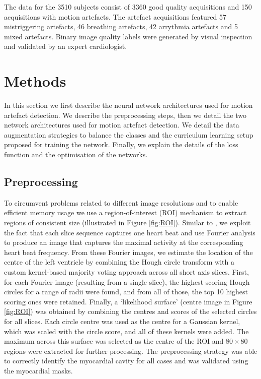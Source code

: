 \documentclass[preprint,12pt,authoryear]{elsarticle}
\begin{document}
The data for the 3510 subjects consist of 3360 good quality acquisitions and 150 acquisitions with motion artefacts.
The artefact acquisitions featured 57 mistriggering artefacts, 46 breathing artefacts, 42 arrythmia artefacts and 5 mixed artefacts. Binary image quality labels were generated by visual inspection and validated by an expert cardiologist.\\




\section{Methods}
\label{sec:methods}

In this section we first describe the neural network architectures used for motion artefact detection. We describe the preprocessing steps, then we detail the two network architectures used for motion artefact detection. We detail the data augmentation strategies to balance the classes and the curriculum learning setup proposed for training the network. Finally, we explain the details of the loss function and the optimisation of the networks.


\subsection{Preprocessing}
\label{sec:pre}

To circumvent problems related to different image resolutions and to enable efficient memory usage we use a region-of-interest (ROI) mechanism to extract regions of consistent size (illustrated in Figure \ref{fig:ROI}). Similar to \cite{Korshunova2016}, we exploit the fact that each slice sequence captures one heart beat and use Fourier analysis to produce an image that captures the maximal activity at the corresponding heart beat frequency.  From these Fourier images, we estimate the location of the centre of the left ventricle by combining the Hough circle transform with a custom kernel-based majority voting approach across all short axis slices. First, for each Fourier image (resulting from a single slice), the  highest scoring Hough circles for a range of radii were found, and from all of those, the  top 10 highest scoring ones were retained. Finally, a ‘likelihood surface’ (centre image in Figure \ref{fig:ROI}) was obtained by combining the centres and scores of the selected circles for all slices. Each circle centre was used as the centre for a Gaussian kernel, which was scaled with the circle score, and all of these kernels were added. The maximum across this surface was selected as the centre of the ROI and $80 \times 80$ regions were extracted for further processing.  The preprocessing strategy was able to correctly identify the myocardial cavity for all cases and  was validated using the myocardial masks.\\
\end{document}
